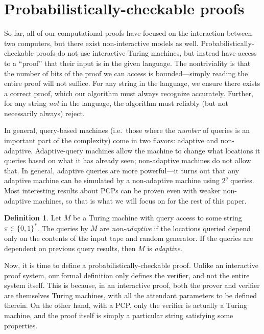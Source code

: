 \documentclass[english,12pt]{reedthesis}
\theoremstyle{plain}
\theoremstyle{definition}
\newtheorem{defn}[defn]{Definition}
\theoremstyle{remark}
\begin{document}
\section{Probabilistically-checkable proofs}\label{sec:pcp}

So far, all of our computational proofs have focused on the interaction between
two computers, but there exist non-interactive models as well.
Probabilistically-checkable proofs do not use interactive Turing machines, but
instead have access to a ``proof'' that their input is in the given language.
The nontriviality is that the number of bits of the proof we can access is
bounded---simply reading the entire proof will not suffice. For any string in the
language, we ensure there exists a correct proof, which our algorithm must
always recognize accurately. Further, for any string \emph{not} in the language,
the algorithm must reliably (but not necessarily always) reject.

In general, query-based machines (i.e.\ those where the \emph{number} of queries
is an important part of the complexity) come in two flavors: adaptive and
non-adaptive. Adaptive-query machines allow the machine to change what locations
it queries based on what it has already seen; non-adaptive machines do not allow
that. In general, adaptive queries are more powerful---it turns out that any
adaptive machine can be simulated by a non-adaptive machine using $2^{q}$
queries. Most interesting results about PCPs can be proven even with weaker
non-adaptive machines, so that is what we will focus on for the rest of this
paper.

\begin{defn}\label{def:adaptive}
  Let $M$ be a Turing machine with query access to some string
  $\pi \in \{0, 1\}^{*}$. The queries by $M$ are \emph{non-adaptive} if the
  locations queried depend only on the contents of the input tape and random
  generator. If the queries are dependent on previous query results, then $M$ is
  \emph{adaptive}.
\end{defn}

Now, it is time to define a probabilistically-checkable proof. Unlike an
interactive proof system, our formal definition only defines the verifier, and
not the entire system itself. This is because, in an interactive proof, both the
prover and verifier are themselves Turing machines, with all the attendant
parameters to be defined therein. On the other hand, with a PCP, only the
verifier is actually a Turing machine, and the proof itself is simply a
particular string satisfying some properties.
\end{document}
